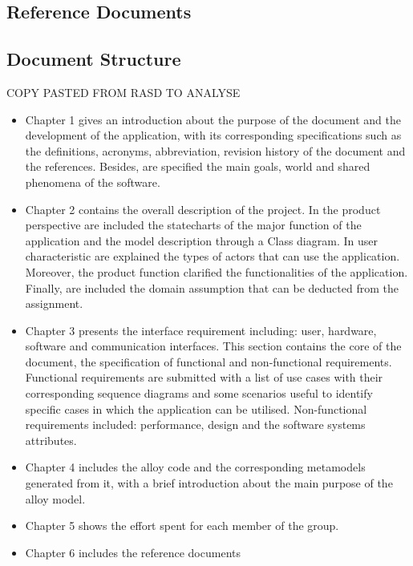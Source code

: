 \subsection{Reference Documents}

\subsection{Document Structure}
COPY PASTED FROM RASD TO ANALYSE
\begin{itemize}

\item
Chapter 1 gives an introduction about the purpose of the document and the development of the
application, with its corresponding specifications such as the definitions, acronyms, abbreviation,
revision history of the document and the references.
Besides, are specified the main goals, world and shared phenomena of the software.

\item
Chapter 2 contains the overall description of the project. In the product perspective are included
the statecharts of the major function of the application and the model description through a Class
diagram. In user characteristic are explained the types of actors that can use the application.
Moreover, the product function clarified the functionalities of the application. Finally, are included
the domain assumption that can be deducted from the assignment.

\item
Chapter 3 presents the interface requirement including: user, hardware, software and
communication interfaces. This section contains the core of the document, the specification of
functional and non-functional requirements. Functional requirements are submitted with a list of
use cases with their corresponding sequence diagrams and some scenarios useful to identify
specific cases in which the application can be utilised. Non-functional requirements included:
performance, design and the software systems attributes.

\item
Chapter 4 includes the alloy code and the corresponding metamodels generated from it, with a
brief introduction about the main purpose of the alloy model.

\item
Chapter 5 shows the effort spent for each member of the group.

\item
Chapter 6 includes the reference documents
\end{itemize}

